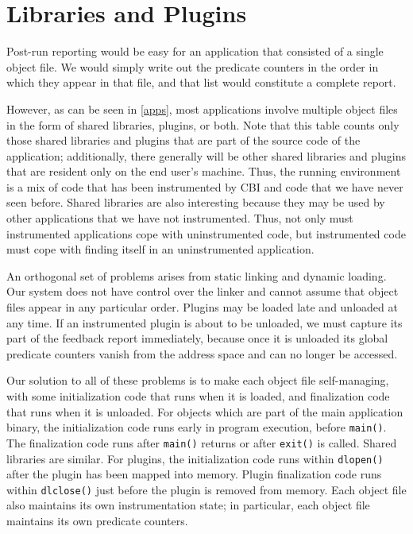 \documentclass[10pt,twocolumn]{article}
\begin{document}
\section{Libraries and Plugins}

Post-run reporting would be easy for an application that consisted of
a single object file.  We would simply write out the predicate
counters in the order in which they appear in that file, and that list
would constitute a complete report.

However, as can be seen in \autoref{apps}, most applications involve
multiple object files in the form of shared libraries, plugins, or
both.  Note that this table counts only those shared libraries and
plugins that are part of the source code of the application;
additionally, there generally will be other shared
libraries and plugins that are resident only on the end user's
machine.  Thus, the running environment is a mix of code that has
been instrumented by CBI and code that we have never seen before.
Shared libraries are also interesting because they may be used by
other applications that we have not instrumented.  Thus, not only must
instrumented applications cope with uninstrumented code, but
instrumented code must cope with finding itself in an
uninstrumented application.

An orthogonal set of problems arises from static linking and dynamic
loading.  Our system does not have control over the linker and
cannot assume that object files appear in any particular order.
Plugins may be loaded late and unloaded at any time.  If an
instrumented plugin is about to be unloaded, we must capture its part
of the feedback report immediately, because once it is unloaded its
global predicate counters vanish from the address space and can no
longer be accessed.

Our solution to all of these problems is to make each object file
self-managing, with some initialization code that runs when it is
loaded, and finalization code that runs when it is unloaded.  For
objects which are part of the main application binary, the
initialization code runs early in program execution, before
\texttt{main()}.  The finalization code runs after \texttt{main()}
returns or after \texttt{exit()} is called.  Shared libraries are
similar.  For plugins, the initialization code runs within
\texttt{dlopen()} after the plugin has been mapped into memory.
Plugin finalization code runs within \texttt{dlclose()} just before
the plugin is removed from memory.  Each object file also maintains
its own instrumentation state; in particular, each object file maintains
its own predicate counters.
\end{document}
